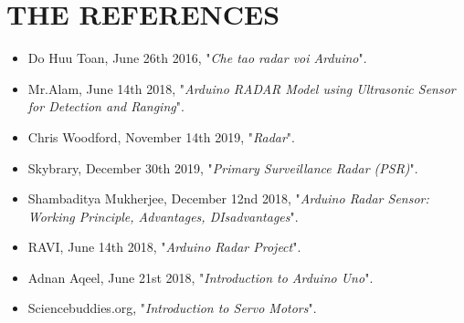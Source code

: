 \documentclass[a4paper,13pt]{report}
\begin{document}
    \chapter{THE REFERENCES}
        \begin{itemize}
            \item Do Huu Toan, June 26th 2016, "\textit{Che tao radar voi Arduino}".
            \item Mr.Alam, June 14th 2018, "\textit{Arduino RADAR Model using Ultrasonic Sensor for Detection and Ranging}".
            \item Chris Woodford, November 14th 2019, "\textit{Radar}".
            \item Skybrary, December 30th 2019, "\textit{Primary Surveillance Radar (PSR)}".
            \item Shambaditya Mukherjee, December 12nd 2018, "\textit{Arduino Radar Sensor: Working Principle, Advantages, DIsadvantages}".
            \item RAVI, June 14th 2018, "\textit{Arduino Radar Project}".
            \item Adnan Aqeel, June 21st 2018, "\textit{Introduction to Arduino Uno}".
            \item Sciencebuddies.org, "\textit{Introduction to Servo Motors}".

        \end{itemize}
\end{document}
